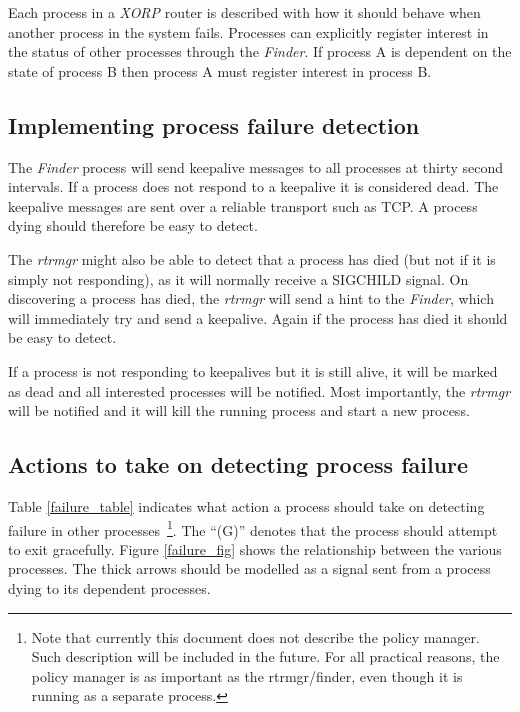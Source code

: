 \documentclass[11pt]{article}
\makeatletter
\newcommand{\xorp} {{\em XORP}\@\xspace}
\newcommand{\finder} {{\em Finder}\@\xspace}
\newcommand{\rtrmgr} {{\em rtrmgr}\@\xspace}
\makeatother
\begin{document}
Each process in a \xorp router is described with how it should behave
when another process in the system fails. Processes can explicitly
register interest in the status of other processes through the
\finder. If process A is dependent on the state of process B then
process A must register interest in process B.

\subsection{Implementing process failure detection}

The \finder process will send keepalive messages to all processes at
thirty second intervals. If a process does not respond to a keepalive
it is considered dead. The keepalive messages are sent over a reliable
transport such as TCP. A process dying should therefore be easy to
detect.

The \rtrmgr might also be able to detect that a process has died (but
not if it is simply not responding), as it will normally receive a
SIGCHILD signal.  On discovering a process has died, the \rtrmgr will
send a hint to the \finder, which will immediately try and send a
keepalive.  Again if the process has died it should be easy to detect.

If a process is not responding to keepalives but it is still alive, it
will be marked as dead and all interested processes will be notified.
Most importantly, the \rtrmgr will be notified and it will kill the
running process and start a new process.

\subsection{Actions to take on detecting process failure}

Table \ref{failure_table} indicates what action a process should take on
detecting failure in other processes~\footnote{Note that currently this
document does not describe the policy manager. Such description will be
included in the future. For all practical reasons, the policy manager is
as important as the rtrmgr/finder, even though it is running as a
separate process.}. The ``(G)'' denotes that the process should attempt
to exit gracefully. Figure \ref{failure_fig} shows the relationship
between the various processes. The thick arrows should be modelled as a
signal sent from a process dying to its dependent processes.
\end{document}
